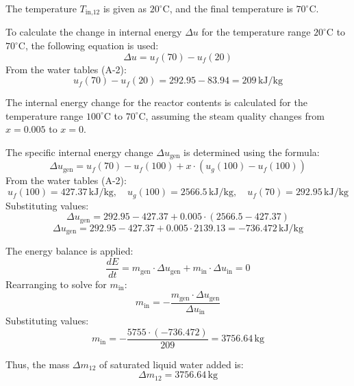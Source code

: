 The temperature \( T_{\text{in,12}} \) is given as \( 20^\circ\text{C} \), and the final temperature is \( 70^\circ\text{C} \).  

To calculate the change in internal energy \( \Delta u \) for the temperature range \( 20^\circ\text{C} \) to \( 70^\circ\text{C} \), the following equation is used:  
\[
\Delta u = u_f(70) - u_f(20)
\]  
From the water tables (A-2):  
\[
u_f(70) - u_f(20) = 292.95 - 83.94 = 209 \, \text{kJ/kg}
\]  

The internal energy change for the reactor contents is calculated for the temperature range \( 100^\circ\text{C} \) to \( 70^\circ\text{C} \), assuming the steam quality changes from \( x = 0.005 \) to \( x = 0 \).  

The specific internal energy change \( \Delta u_{\text{gen}} \) is determined using the formula:  
\[
\Delta u_{\text{gen}} = u_f(70) - u_f(100) + x \cdot (u_g(100) - u_f(100))
\]  
From the water tables (A-2):  
\[
u_f(100) = 427.37 \, \text{kJ/kg}, \quad u_g(100) = 2566.5 \, \text{kJ/kg}, \quad u_f(70) = 292.95 \, \text{kJ/kg}
\]  
Substituting values:  
\[
\Delta u_{\text{gen}} = 292.95 - 427.37 + 0.005 \cdot (2566.5 - 427.37)
\]  
\[
\Delta u_{\text{gen}} = 292.95 - 427.37 + 0.005 \cdot 2139.13 = -736.472 \, \text{kJ/kg}
\]  

The energy balance is applied:  
\[
\frac{dE}{dt} = m_{\text{gen}} \cdot \Delta u_{\text{gen}} + m_{\text{in}} \cdot \Delta u_{\text{in}} = 0
\]  
Rearranging to solve for \( m_{\text{in}} \):  
\[
m_{\text{in}} = -\frac{m_{\text{gen}} \cdot \Delta u_{\text{gen}}}{\Delta u_{\text{in}}}
\]  
Substituting values:  
\[
m_{\text{in}} = -\frac{5755 \cdot (-736.472)}{209} = 3756.64 \, \text{kg}
\]  

Thus, the mass \( \Delta m_{12} \) of saturated liquid water added is:  
\[
\Delta m_{12} = 3756.64 \, \text{kg}
\]